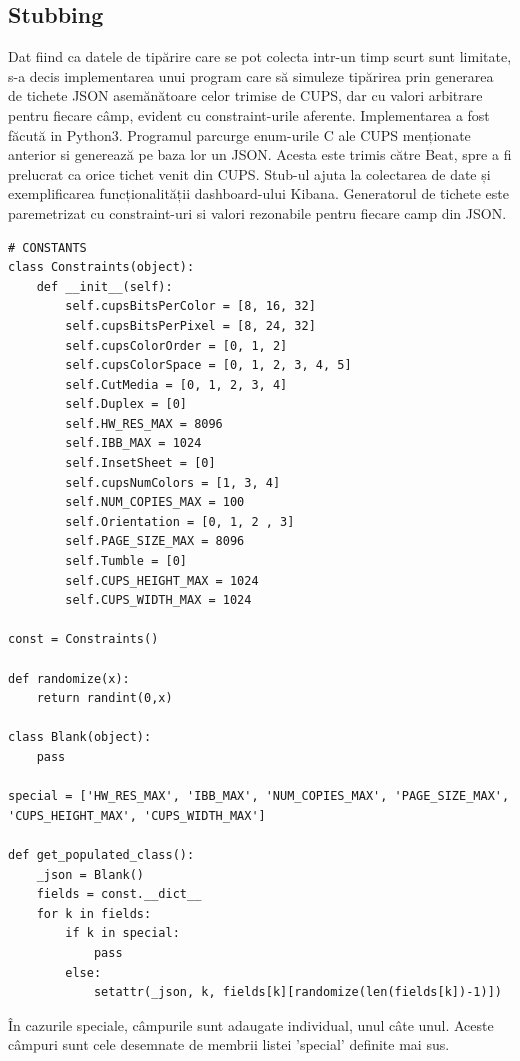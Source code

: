 \documentclass[a4paper, 12pt, twoside]{report}
\begin{document}
	\subsection{Stubbing}
	Dat fiind ca datele de tipărire care se pot colecta intr-un timp scurt sunt limitate, s-a decis implementarea unui program care să simuleze tipărirea prin generarea de tichete JSON asemănătoare celor trimise de CUPS, dar cu valori arbitrare pentru fiecare câmp, evident cu constraint-urile aferente. Implementarea a fost făcută in Python3. Programul parcurge enum-urile C ale CUPS menționate anterior si generează pe baza lor un JSON. Acesta este trimis către Beat, spre a fi prelucrat ca orice tichet venit din CUPS. Stub-ul ajuta la colectarea de date și exemplificarea funcționalității dashboard-ului Kibana. Generatorul de tichete este paremetrizat cu constraint-uri si valori rezonabile pentru fiecare camp din JSON.  
\begin{lstlisting}[caption={cazul general dupa care se populeaza tichetul - Pyton},captionpos=b]
# CONSTANTS
class Constraints(object):
    def __init__(self):
        self.cupsBitsPerColor = [8, 16, 32]
        self.cupsBitsPerPixel = [8, 24, 32]
        self.cupsColorOrder = [0, 1, 2]
        self.cupsColorSpace = [0, 1, 2, 3, 4, 5]
        self.CutMedia = [0, 1, 2, 3, 4]
        self.Duplex = [0]
        self.HW_RES_MAX = 8096
        self.IBB_MAX = 1024
        self.InsetSheet = [0]
        self.cupsNumColors = [1, 3, 4]
        self.NUM_COPIES_MAX = 100
        self.Orientation = [0, 1, 2 , 3]
        self.PAGE_SIZE_MAX = 8096
        self.Tumble = [0]
        self.CUPS_HEIGHT_MAX = 1024
        self.CUPS_WIDTH_MAX = 1024

const = Constraints()

def randomize(x):
    return randint(0,x)

class Blank(object):
    pass

special = ['HW_RES_MAX', 'IBB_MAX', 'NUM_COPIES_MAX', 'PAGE_SIZE_MAX', 'CUPS_HEIGHT_MAX', 'CUPS_WIDTH_MAX']

def get_populated_class():
    _json = Blank()
    fields = const.__dict__
    for k in fields:
        if k in special:
            pass
        else:
            setattr(_json, k, fields[k][randomize(len(fields[k])-1)])
\end{lstlisting}
În cazurile speciale, câmpurile sunt adaugate individual, unul câte unul. Aceste câmpuri sunt cele desemnate de membrii listei 'special' definite mai sus.
\end{document}
